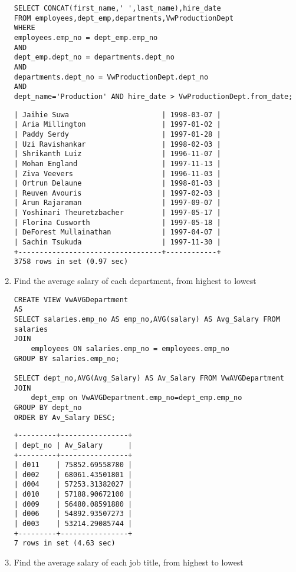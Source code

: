 \documentclass[]{article}
\begin{document}
\begin{enumerate}
\begin{verbatim}
SELECT CONCAT(first_name,' ',last_name),hire_date
FROM employees,dept_emp,departments,VwProductionDept
WHERE
employees.emp_no = dept_emp.emp_no
AND
dept_emp.dept_no = departments.dept_no
AND
departments.dept_no = VwProductionDept.dept_no
AND
dept_name='Production' AND hire_date > VwProductionDept.from_date;

\end{verbatim}

\begin{verbatim}
| Jaihie Suwa                      | 1998-03-07 |
| Aria Millington                  | 1997-01-02 |
| Paddy Serdy                      | 1997-01-28 |
| Uzi Ravishankar                  | 1998-02-03 |
| Shrikanth Luiz                   | 1996-11-07 |
| Mohan England                    | 1997-11-13 |
| Ziva Veevers                     | 1996-11-03 |
| Ortrun Delaune                   | 1998-01-03 |
| Reuven Avouris                   | 1997-02-03 |
| Arun Rajaraman                   | 1997-09-07 |
| Yoshinari Theuretzbacher         | 1997-05-17 |
| Florina Cusworth                 | 1997-05-18 |
| DeForest Mullainathan            | 1997-04-07 |
| Sachin Tsukuda                   | 1997-11-30 |
+----------------------------------+------------+
3758 rows in set (0.97 sec)
\end{verbatim}

\item Find the average salary of each department, from highest to lowest

\begin{verbatim}
CREATE VIEW VwAVGDepartment
AS
SELECT salaries.emp_no AS emp_no,AVG(salary) AS Avg_Salary FROM salaries
JOIN 
	employees ON salaries.emp_no = employees.emp_no
GROUP BY salaries.emp_no;

SELECT dept_no,AVG(Avg_Salary) AS Av_Salary FROM VwAVGDepartment
JOIN 
	dept_emp on VwAVGDepartment.emp_no=dept_emp.emp_no
GROUP BY dept_no
ORDER BY Av_Salary DESC;
\end{verbatim}

\begin{verbatim}
+---------+----------------+
| dept_no | Av_Salary      |
+---------+----------------+
| d011    | 75852.69558780 |
| d002    | 68061.43501801 |
| d004    | 57253.31382027 |
| d010    | 57188.90672100 |
| d009    | 56480.08591880 |
| d006    | 54892.93507273 |
| d003    | 53214.29085744 |
+---------+----------------+
7 rows in set (4.63 sec)
\end{verbatim}

\item Find the average salary of each job title, from highest to lowest


\end{enumerate}
\end{document}
